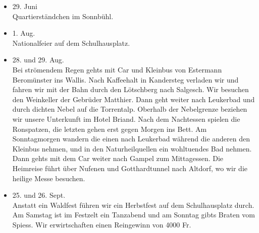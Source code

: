 \begin{multicols}{2}
\begin{itemize}
        \item[]29. Juni\\
        Quartierständchen im Sonnbühl.

        \item[]1. Aug.\\
        Nationalfeier auf dem Schulhausplatz.

        \item[]28. und 29. Aug.\\
        Bei strömendem Regen gehts mit Car und Kleinbus von Estermann
        Beromünster ins Wallis. Nach Kaffeehalt in Kandersteg verladen wir und
        fahren wir mit der Bahn durch den Lötschberg nach Salgesch. Wir besuchen
        den Weinkeller der Gebrüder Matthier. Dann geht weiter nach Leukerbad
        und durch dichten Nebel auf die Torrentalp. Oberhalb der Nebelgrenze
        beziehen wir unsere Unterkunft im Hotel Briand. Nach dem Nachtessen
        spielen die Ronspatzen, die letzten gehen erst gegen Morgen ins Bett. Am
        Sonntagmorgen wandern die einen nach Leukerbad während die anderen den
        Kleinbus nehmen, und in den Naturheilquellen ein wohltuendes Bad nehmen.
        Dann gehts mit dem Car weiter nach Gampel zum Mittagessen. Die Heimreise
        führt über Nufenen und Gotthardtunnel nach Altdorf, wo wir die heilige
        Messe besuchen.

        \item[]25. und 26. Sept.\\
        Anstatt ein Waldfest führen wir ein Herbstfest auf dem Schulhausplatz
        durch. Am Samstag ist im Festzelt ein Tanzabend und am Sonntag gibts
        Braten vom Spiess. Wir erwirtschaften einen Reingewinn von 4000 Fr.

    \end{itemize}

\end{multicols}
